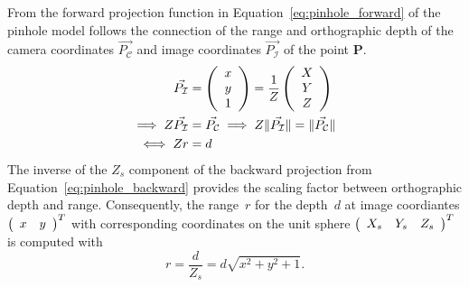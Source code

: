 From the forward projection function in Equation~\ref{eq:pinhole_forward} of the pinhole model follows the connection of the range and orthographic depth of the camera coordinates $\vec{P_\mathcal{C}}$ and image coordinates $\vec{P_\mathcal{I}}$ of the point $\mathbf{P}$.
\begin{equation}
\begin{aligned}
    \vec{P_\mathcal{I}} &= \left(\begin{array}{c} x \\ y \\ 1 \end{array}\right) = \frac{1}{Z}\left(\begin{array}{c} X \\ Y \\ Z \end{array}\right) \\
    \implies Z \vec{P_\mathcal{I}} &= \vec{P_\mathcal{C}} \implies Z \lVert\vec{P_\mathcal{I}}\rVert = \lVert\vec{P_\mathcal{C}}\rVert \\
    \iff Z r &= d
\end{aligned}
\end{equation}
The inverse of the $Z_{s}$ component of the backward projection from Equation~\ref{eq:pinhole_backward} provides the scaling factor between orthographic depth and range.
Consequently, the range~$r$ for the depth~$d$ at image coordiantes $\left(\begin{array}{cc} x & y \end{array}\right)^T$ with corresponding coordinates on the unit sphere $\left(\begin{array}{ccc} X_s & Y_s & Z_s \end{array}\right)^T$ is computed with
\begin{equation}
    r = \frac{d}{Z_s} = d \sqrt{x^2 + y^2 + 1}\text{.}
\end{equation}
